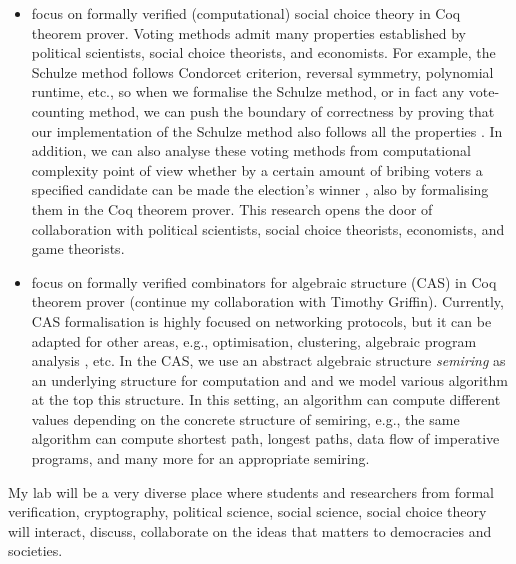 \documentclass[a4paper]{article}
\begin{document}
\begin{itemize}
\item focus on formally verified (computational) social choice theory in Coq theorem prover. 
	Voting methods admit many properties established by political scientists, social choice theorists, 
	and economists. For example, the Schulze method follows Condorcet criterion, reversal symmetry,
	polynomial runtime, etc., so when we formalise the Schulze method, or in fact any vote-counting method, 
	we can push the boundary of correctness by proving that our 
	implementation of the Schulze method also follows all the properties \cite{tiwari2021machine}. 
	In addition, we can also analyse these voting
	methods from computational complexity point of view whether by a certain amount of bribing
	voters a specified candidate can be made the election's winner \cite{faliszewski2006complexity},
	also by formalising them in the Coq theorem prover. 
	This research opens the door of collaboration with political scientists, 
	social choice theorists, economists, and game theorists.

\item focus on formally verified combinators for algebraic structure (CAS) in Coq theorem prover 
	(continue my collaboration with Timothy Griffin). 
	Currently, CAS formalisation is highly focused on networking protocols, but it can be 
	adapted for other areas, e.g., optimisation, clustering, algebraic program 
	analysis , etc. In the CAS, we use an abstract algebraic structure 
	\emph{semiring} as an underlying structure
	for computation and and we model various algorithm at the top this 
	structure. In this setting, an algorithm can compute different values depending 
	on the concrete structure of semiring, e.g., the same algorithm 
	can compute shortest path, longest paths, 
	data flow of imperative programs, and many more \cite{gondran2008graphs} 
	for an appropriate semiring.
	

\end{itemize}

My lab will be a very diverse place where students and researchers from formal 
verification, cryptography, 
political science, social science, social choice theory will interact, discuss, 
collaborate on the ideas that matters to democracies and societies.


 

\end{document}
